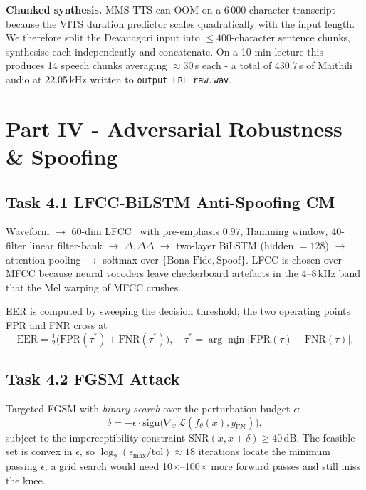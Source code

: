 \documentclass[conference]{IEEEtran}
\begin{document}
\textbf{Chunked synthesis.}
MMS-TTS can OOM on a 6\,000-character transcript because the VITS
duration predictor scales quadratically with the input length. We
therefore split the Devanagari input into $\leq 400$-character
sentence chunks, synthesise each independently and concatenate. On
a 10-min lecture this produces 14 speech chunks averaging $\approx
30$\,s each - a total of $430.7$\,s of Maithili audio at
22.05\,kHz written to \texttt{output\_LRL\_raw.wav}.

\section{Part IV - Adversarial Robustness \& Spoofing}

\subsection{Task 4.1 LFCC-BiLSTM Anti-Spoofing CM}
Waveform $\to$ 60-dim LFCC~\cite{sahidullah2015lfcc} with pre-emphasis
$0.97$, Hamming window, 40-filter linear filter-bank $\to$
$\Delta,\Delta\Delta$ $\to$ two-layer BiLSTM (hidden $=128$) $\to$
attention pooling $\to$ softmax over
$\{\text{Bona-Fide},\text{Spoof}\}$. LFCC is chosen over MFCC because
neural vocoders leave checkerboard artefacts in the 4--8\,kHz band
that the Mel warping of MFCC crushes.

EER is computed by sweeping the decision threshold; the two operating
points FPR and FNR cross at
\[
\text{EER} = \tfrac{1}{2}\bigl(\text{FPR}(\tau^*)+\text{FNR}(\tau^*)\bigr),\quad
\tau^* = \arg\min_\tau |\text{FPR}(\tau)-\text{FNR}(\tau)|.
\]

\subsection{Task 4.2 FGSM Attack}
Targeted FGSM with \textit{binary search} over the perturbation
budget $\epsilon$:
\begin{equation}
\delta = -\epsilon\cdot\text{sign}\!\bigl(\nabla_{\!x}\,\mathcal{L}(f_\theta(x), y_\text{EN})\bigr),
\label{eq:fgsm}
\end{equation}
subject to the imperceptibility constraint
$\text{SNR}(x,x+\delta) \geq 40\,\mathrm{dB}$. The feasible set is
convex in $\epsilon$, so
$\log_2(\epsilon_\text{max}/\text{tol})\approx 18$ iterations locate
the minimum passing $\epsilon$; a grid search would need
10$\times$--100$\times$ more forward passes and still miss the knee.
\end{document}
